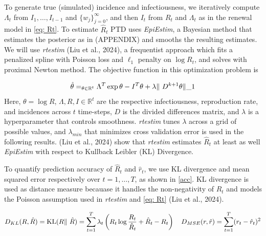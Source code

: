 \documentclass[12pt]{article}
\let\argmin\relax\DeclareMathOperator*{\argmin}{argmin}
\begin{document}
      To generate true (simulated) incidence and infectiousness, we iteratively compute $\Lambda_t$ from $I_{1},\dots,I_{t - 1}$ and 
      $\{w_j\}_{j=0}^\infty$, and then $I_t$ from $R_t$ and $\Lambda_t$ as in the renewal model in \cref{eq: Rt}. To estimate $\hat{R}_t$
      PTD uses \textit{EpiEstim}, a Bayesian method that estimates the posterior as in (APPENDIX) and smooths the resulting estimates.
      We will use \textit{rtestim} (Liu et al., 2024), a frequentist approach which fits a penalized spline with Poisson loss and $\ell_1$ penalty on $\log{R_t}$, and solves with proximal Newton method.
      The objective function in this optimization problem is

      \begin{equation} \label{rtestim}
        \hat{\theta} = \argmin_{\theta \in \mathbb{R}^t} \Lambda^T \exp{\theta} - I^T\theta + \lambda \Vert\ D^{k+1} \theta \Vert\_1
      \end{equation}
      Here, $\theta = \log{R}$, $\Lambda, R, I \in \mathbb{R}^t$  are the respective infectiousness, reproduction rate, and incidences across $t$ time-steps, $D$ is the divided differences matrix, and $\lambda$ is a hyperparameter that controls smoothness. 
      \textit{rtestim} tunes $\lambda$ across a grid of possible values, and $\lambda_{min}$ that minimizes cross validation error is used in the following results. 
      (Liu et al., 2024) show that \textit{rtestim} estimates $\hat{R}_t$ at least as well \textit{EpiEstim} with respect to Kullback Leibler (KL)  Divergence.

      To quantify prediction accuracy of $\hat{R}_t$ and $\hat{r}_t$, we use KL divergence and mean squared error respectively over $t = 1,\dots,T$, as shown in \cref{acc}.
      KL divergence is used as distance measure becauase it handles the non-negativity of $R_t$ and models the Poisson assumption 
      used in \textit{rtestim} and \cref{eq: Rt} (Liu et al., 2024).

      \begin{equation} \label{acc}
        D_{KL}(R, \hat{R}) = \operatorname{KL}(R \Vert\ \hat{R}) = \sum_{t = 1}^T \lambda_t \left( R_t \log{\frac{R_t}{\hat{R}_t}} + \hat{R}_t - R_t \right) \quad 
        D_{MSE}(r, \hat{r}) = \sum_{t = 1}^T (r_t - \hat{r}_t)^2
      \end{equation}
\end{document}
